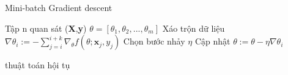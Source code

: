 \begin{algorithm}[H]
\label{alg:minibatch}
\caption{Mini-batch Gradient descent}
\begin{algorithmic}[1]
\REQUIRE Tập n quan sát (\textbf{X},\textbf{y})
\REQUIRE $\theta=[\theta_1,\theta_2,...,\theta_m]$
\REPEAT 
\STATE Xáo trộn dữ liệu
\STATE $\nabla \theta_i := -\sum^{i+k}_{j=i} \nabla_{\theta}f(\theta;\textbf{x}_j,y_j)$
\STATE Chọn bước nhảy $\eta$
\STATE Cập nhật $\theta := \theta - \eta\nabla\theta_i$
	\STATE {}
\ENDIF

\ENDFOR

\UNTIL	thuật toán hội tụ
\end{algorithmic} 

\end{algorithm}

